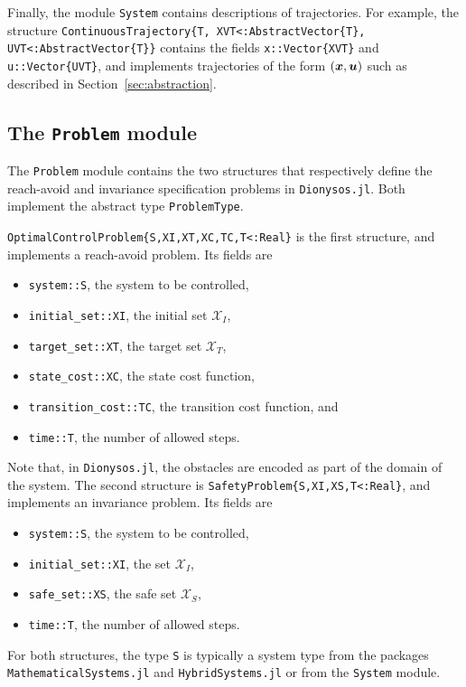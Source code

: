\documentclass{juliacon}
\begin{document}
\vskip 6pt

Finally, the module \texttt{System} contains descriptions of trajectories. For example, the structure \texttt{ContinuousTrajectory\{T, XVT<:AbstractVector\{T\}, UVT<:AbstractVector\{T\}\}} contains the fields \texttt{x::Vector\{XVT\}} and \texttt{u::Vector\{UVT\}}, and implements trajectories of the form $(\boldsymbol{x}, \boldsymbol{u})$ such as described in Section~\ref{sec:abstraction}.

\subsection{The \texttt{Problem} module}

The \texttt{Problem} module contains the two structures that respectively define the reach-avoid and invariance specification problems in \texttt{Dionysos.jl}. Both implement the abstract type \texttt{ProblemType}.

\vskip 6pt

\texttt{OptimalControlProblem\{S,XI,XT,XC,TC,T<:Real\}} is the first structure, and implements a reach-avoid problem. Its fields are
\begin{itemize}
    \item \texttt{system::S}, the system to be controlled, 
    \item \texttt{initial\_set::XI}, the initial set $\mathcal{X}_I$, 
    \item \texttt{target\_set::XT}, the target set $\mathcal{X}_T$, 
    \item \texttt{state\_cost::XC}, the state cost function, 
    \item \texttt{transition\_cost::TC}, the transition cost function, and
    \item \texttt{time::T}, the number of allowed steps.
\end{itemize}
Note that, in \texttt{Dionysos.jl}, the obstacles are encoded as part of the domain of the system. The second structure is \texttt{SafetyProblem\{S,XI,XS,T<:Real\}}, and implements an invariance problem. Its fields are 
\begin{itemize}
    \item \texttt{system::S}, the system to be controlled,
    \item \texttt{initial\_set::XI}, the set $\mathcal{X}_I$,
    \item \texttt{safe\_set::XS}, the safe set $\mathcal{X}_S$, 
    \item \texttt{time::T}, the number of allowed steps.
\end{itemize}
For both structures, the type \texttt{S} is typically a system type from the packages \texttt{MathematicalSystems.jl} and \texttt{HybridSystems.jl} or from the \texttt{System} module. 
\end{document}
